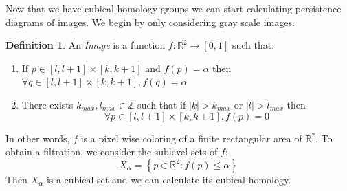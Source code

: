 \documentclass{article}
\newcommand{\R}{\mathbb{R}}
\newcommand{\Z}{\mathbb{Z}}
\theoremstyle{plain}
\theoremstyle{definition}
\newtheorem{definition}[thm]{Definition}
\theoremstyle{remark}
\begin{document}
Now that we have cubical homology groups we can start calculating persistence diagrams of images. We begin by only considering gray scale images.
\begin{definition}
An \emph{Image} is a function $f:\R^2 \to [0,1]$ such that:
\begin{enumerate}
    \item If $p \in [l,l+1] \times [k,k+1]$ and $f(p)=\alpha$ then $\forall q \in [l,l+1] \times [k,k+1], f(q)=\alpha$
    \item There exists $k_{max},l_{max} \in \Z$ such that if $|k|>k_{max}$ or $|l|>l_{max}$ then \[\forall p \in [l,l+1] \times [k,k+1], f(p) = 0\]
\end{enumerate}
\end{definition}
In other words, $f$ is a pixel wise coloring of a finite rectangular area of $\R^2$.
To obtain a filtration, we consider the sublevel sets of $f$:
\[ X_\alpha = \left\{ p \in \R^2 : f(p)\leq \alpha \right\} \]
Then $X_\alpha$ is a cubical set and we can calculate its cubical homology.
\end{document}
